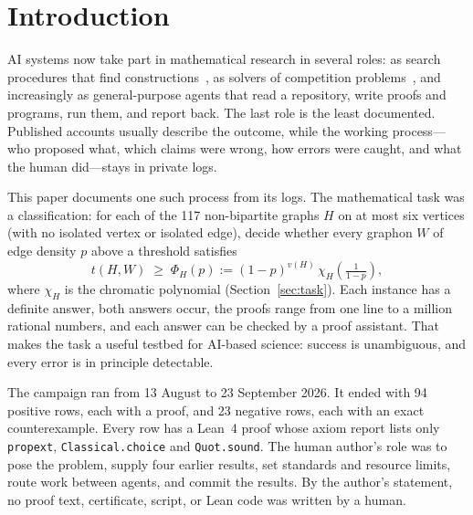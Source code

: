 \documentclass[11pt,a4paper]{article}
\newcommand{\ttt}[1]{\texttt{#1}}
\begin{document}
\tableofcontents

\section{Introduction}

AI systems now take part in mathematical research in several roles: as search procedures that find
constructions~\cite{romera2024funsearch}, as solvers of competition problems~\cite{trinh2024alphageometry},
and increasingly as general-purpose agents that read a repository, write proofs and programs, run them, and
report back. The last role is the least documented. Published accounts usually describe the outcome, while
the working process---who proposed what, which claims were wrong, how errors were caught, and what the human
did---stays in private logs.

This paper documents one such process from its logs. The mathematical task was a classification: for each of
the 117 non-bipartite graphs $H$ on at most six vertices (with no isolated vertex or isolated edge), decide
whether every graphon $W$ of edge density $p$ above a threshold satisfies
\[
  t(H,W)\;\ge\;\Phi_H(p):=(1-p)^{v(H)}\,\chi_H\!\left(\tfrac{1}{1-p}\right),
\]
where $\chi_H$ is the chromatic polynomial (Section~\ref{sec:task}). Each instance has a definite answer,
both answers occur, the proofs range from one line to a million rational numbers, and each answer can be
checked by a proof assistant. That makes the task a useful testbed for AI-based science: success is
unambiguous, and every error is in principle detectable.

The campaign ran from 13 August to 23 September 2026. It ended with 94 positive rows, each with a proof, and
23 negative rows, each with an exact counterexample. Every row has a Lean~4 proof whose axiom report lists only
\ttt{propext}, \ttt{Classical.choice} and \ttt{Quot.sound}. The human author's role was to pose the problem,
supply four earlier results, set standards and resource limits, route work between agents, and commit the
results. By the author's statement, no proof text, certificate, script, or Lean code was written by a human.
\end{document}
